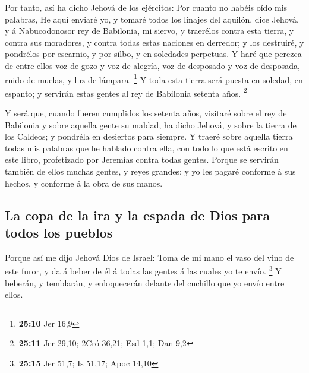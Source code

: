  Por tanto, así ha dicho Jehová de los ejércitos: Por cuanto
no habéis oído mis palabras,  He aquí enviaré yo, y tomaré
todos los linajes del aquilón, dice Jehová, y á Nabucodonosor rey de
Babilonia, mi siervo, y traerélos contra esta tierra, y contra sus
moradores, y contra todas estas naciones en derredor; y los destruiré, y
pondrélos por escarnio, y por silbo, y en soledades perpetuas.
 Y haré que perezca de entre ellos voz de gozo y voz de
alegría, voz de desposado y voz de desposada, ruido de muelas, y luz de
lámpara. \footnote{\textbf{25:10} Jer 16,9}  Y toda esta
tierra será puesta en soledad, en espanto; y servirán estas gentes al
rey de Babilonia setenta años. \footnote{\textbf{25:11} Jer 29,10; 2Cró
  36,21; Esd 1,1; Dan 9,2}

 Y será que, cuando fueren cumplidos los setenta años,
visitaré sobre el rey de Babilonia y sobre aquella gente su maldad, ha
dicho Jehová, y sobre la tierra de los Caldeos; y pondréla en desiertos
para siempre.  Y traeré sobre aquella tierra todas mis
palabras que he hablado contra ella, con todo lo que está escrito en
este libro, profetizado por Jeremías contra todas gentes. 
Porque se servirán también de ellos muchas gentes, y reyes grandes; y yo
les pagaré conforme á sus hechos, y conforme á la obra de sus manos.

\hypertarget{la-copa-de-la-ira-y-la-espada-de-dios-para-todos-los-pueblos}{%
\subsection{La copa de la ira y la espada de Dios para todos los
pueblos}\label{la-copa-de-la-ira-y-la-espada-de-dios-para-todos-los-pueblos}}

 Porque así me dijo Jehová Dios de Israel: Toma de mi mano
el vaso del vino de este furor, y da á beber de él á todas las gentes á
las cuales yo te envío. \footnote{\textbf{25:15} Jer 51,7; Is 51,17;
  Apoc 14,10}  Y beberán, y temblarán, y enloquecerán
delante del cuchillo que yo envío entre ellos.

